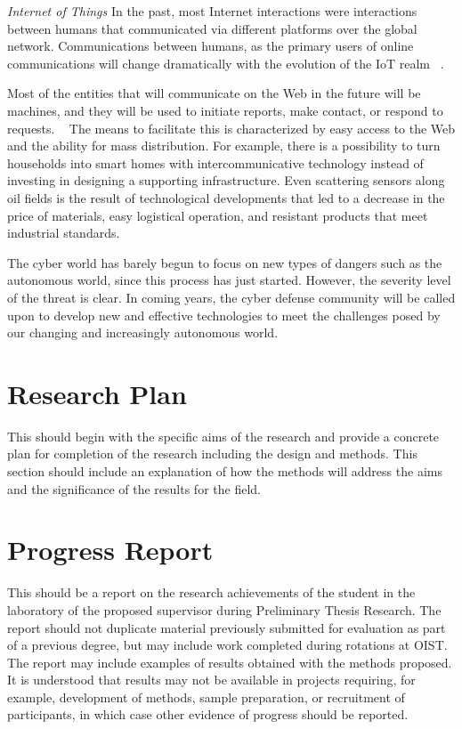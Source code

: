 \textit{Internet of Things} In the past, most Internet interactions were interactions between humans that communicated via different platforms over the global network. 
Communications between humans, as the primary users of online communications will change dramatically with the evolution of the IoT realm ~\cite{Ko:2016:STU:2909066.2835492}. 

Most of the entities that will communicate on the Web in the future will be machines, and they will be used to initiate 
reports, make contact, or respond to requests. ~\cite{Komninos:2012}
The means to facilitate this is characterized by easy access to the Web and the ability for mass distribution. For example, there is a possibility to turn households into smart homes with 
intercommunicative technology instead of investing in designing a supporting infrastructure. 
Even scattering sensors along oil fields is the result of technological developments that led to a decrease in 
the price of materials, easy logistical operation, and resistant products that meet industrial standards. ~\cite{Chen:2017:DAI:3046067.3046227}

The cyber world has barely begun to focus on new types of dangers such as the autonomous world, since this process has just started. However, the severity 
level of the threat is clear. In coming years, the cyber defense community will be called upon to develop 
new and effective technologies to meet the challenges posed by our changing and increasingly autonomous world.



\section{Research Plan}

 This should begin with the specific aims of the research and provide a concrete plan for completion of the research including the design and methods. This section should include an explanation of how the methods will address the aims and the significance of the results for the field.

\section{Progress Report}

This should be a report on the research achievements of the student in the laboratory of the proposed supervisor during Preliminary Thesis Research. 
The report should not duplicate material previously submitted for evaluation as part of a previous degree, but may include work completed during rotations at OIST. 
The report may include examples of results obtained with the methods proposed. It is understood that results may not be available in projects 
requiring, for example, development of methods, sample preparation, or recruitment of participants, in which case other evidence of progress should be reported.


